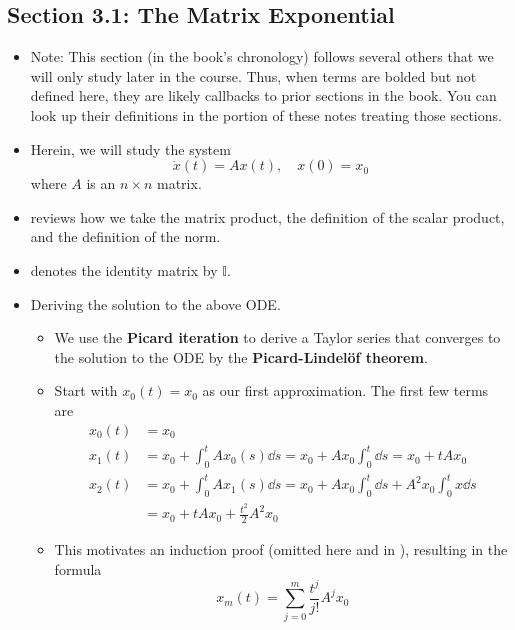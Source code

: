 \documentclass[../notes.tex]{subfiles}
\begin{document}
\subsection*{Section 3.1: The Matrix Exponential}
\begin{itemize}
    \item {}Note: This section (in the book's chronology) follows several others that we will only study later in the course. Thus, when terms are bolded but not defined here, they are likely callbacks to prior sections in the book. You can look up their definitions in the portion of these notes treating those sections.
    \item Herein, we will study the system
    \begin{equation*}
        \dot{x}(t) = Ax(t)
        ,\quad
        x(0) = x_0
    \end{equation*}
    where $A$ is an $n\times n$ matrix.
    \item \textcite{bib:Teschl} reviews how we take the matrix product, the definition of the scalar product, and the definition of the norm.
    \item \textcite{bib:Teschl} denotes the identity matrix by $\mathbb{I}$.
    \item Deriving the solution to the above ODE.
    \begin{itemize}
        \item We use the \textbf{Picard iteration} to derive a Taylor series that converges to the solution to the ODE by the \textbf{Picard-Lindel\"{o}f theorem}.
        \item Start with $x_0(t)=x_0$ as our first approximation. The first few terms are
        \begin{align*}
            x_0(t) &= x_0\\
            x_1(t) &= x_0+\int_0^tAx_0(s)\dd{s}
                = x_0+Ax_0\int_0^t\dd{s}
                = x_0+tAx_0\\
            x_2(t) &= x_0+\int_0^tAx_1(s)\dd{s}
                = x_0+Ax_0\int_0^t\dd{s}+A^2x_0\int_0^tx\dd{s}\\
                &= x_0+tAx_0+\frac{t^2}{2}A^2x_0
        \end{align*}
        \item This motivates an induction proof (omitted here and in \textcite{bib:Teschl}), resulting in the formula
        \begin{equation*}
            x_m(t) = \sum_{j=0}^m\frac{t^j}{j!}A^jx_0
        \end{equation*}

\end{itemize}
\end{itemize}
\end{document}
